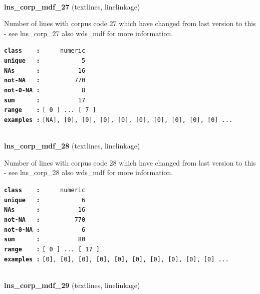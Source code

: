 \documentclass[]{article}
\begin{document}
~

\textbf{lns\_corp\_mdf\_27} (textlines, linelinkage)

Number of lines with corpus code 27 which have changed from last version
to this - see lns\_corp\_27 also wds\_mdf for more information.

\textbf{\texttt{class\ \ \ \ :}} \texttt{~~~~~numeric}\\
\textbf{\texttt{unique\ \ \ :}} \texttt{~~~~~~~~~~~5}\\
\textbf{\texttt{NAs\ \ \ \ \ \ :}} \texttt{~~~~~~~~~~16}\\
\textbf{\texttt{not-NA\ \ \ :}} \texttt{~~~~~~~~~770}\\
\textbf{\texttt{not-0-NA\ :}} \texttt{~~~~~~~~~~~8}\\
\textbf{\texttt{sum\ \ \ \ \ \ :}} \texttt{~~~~~~~~~~17}\\
\textbf{\texttt{range\ \ \ \ :}}
\texttt{{[}\ 0\ {]}\ ...\ {[}\ 7\ {]}}\\
\textbf{\texttt{examples\ :}}
\texttt{{[}NA{]},\ {[}0{]},\ {[}0{]},\ {[}0{]},\ {[}0{]},\ {[}0{]},\ {[}0{]},\ {[}0{]},\ {[}0{]},\ {[}0{]}\ ...}\\

~

\textbf{lns\_corp\_mdf\_28} (textlines, linelinkage)

Number of lines with corpus code 28 which have changed from last version
to this - see lns\_corp\_28 also wds\_mdf for more information.

\textbf{\texttt{class\ \ \ \ :}} \texttt{~~~~~numeric}\\
\textbf{\texttt{unique\ \ \ :}} \texttt{~~~~~~~~~~~6}\\
\textbf{\texttt{NAs\ \ \ \ \ \ :}} \texttt{~~~~~~~~~~16}\\
\textbf{\texttt{not-NA\ \ \ :}} \texttt{~~~~~~~~~770}\\
\textbf{\texttt{not-0-NA\ :}} \texttt{~~~~~~~~~~~6}\\
\textbf{\texttt{sum\ \ \ \ \ \ :}} \texttt{~~~~~~~~~~80}\\
\textbf{\texttt{range\ \ \ \ :}}
\texttt{{[}\ 0\ {]}\ ...\ {[}\ 17\ {]}}\\
\textbf{\texttt{examples\ :}}
\texttt{{[}0{]},\ {[}0{]},\ {[}0{]},\ {[}0{]},\ {[}0{]},\ {[}0{]},\ {[}0{]},\ {[}0{]},\ {[}0{]},\ {[}0{]}\ ...}\\

~

\textbf{lns\_corp\_mdf\_29} (textlines, linelinkage)
\end{document}
